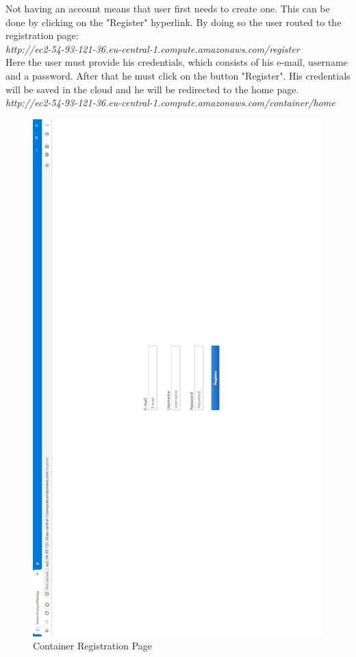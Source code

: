 Not having an account means that user first needs to create one. This can be done by clicking on the "Register" hyperlink. By doing so the user routed to the registration page:\\

\textit{http://ec2-54-93-121-36.eu-central-1.compute.amazonaws.com/register}\\

Here the user must provide his credentials, which consists of his e-mail, username and a password. After that he must click on the button "Register". His credentials will be saved in the cloud and he will be redirected to the home page.\\

\textit{http://ec2-54-93-121-36.eu-central-1.compute.amazonaws.com/container/home}\\

\begin{figure}[p]
	\centering
	\noindent
	\includegraphics[width=0.5\paperwidth]{./images/guide/container/register.PNG}
	\caption{Container Registration Page}
	\label{fig:containerRegister}
\end{figure}

